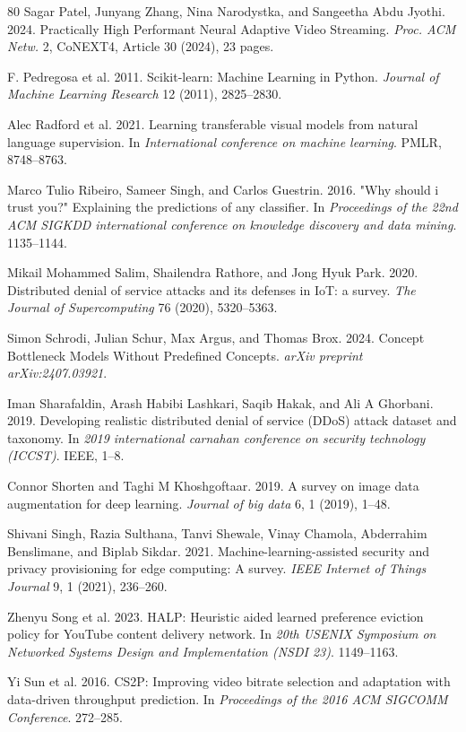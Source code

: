\documentclass[11pt,a4paper]{article}
\begin{document}
\begin{thebibliography}{80}
 Sagar Patel, Junyang Zhang, Nina Narodystka, and Sangeetha Abdu Jyothi. 2024. Practically High Performant Neural Adaptive Video Streaming. \emph{Proc. ACM Netw.} 2, CoNEXT4, Article 30 (2024), 23 pages.

 F. Pedregosa et al. 2011. Scikit-learn: Machine Learning in Python. \emph{Journal of Machine Learning Research} 12 (2011), 2825--2830.

 Alec Radford et al. 2021. Learning transferable visual models from natural language supervision. In \emph{International conference on machine learning}. PMLR, 8748--8763.

 Marco Tulio Ribeiro, Sameer Singh, and Carlos Guestrin. 2016. "Why should i trust you?" Explaining the predictions of any classifier. In \emph{Proceedings of the 22nd ACM SIGKDD international conference on knowledge discovery and data mining}. 1135--1144.

 Mikail Mohammed Salim, Shailendra Rathore, and Jong Hyuk Park. 2020. Distributed denial of service attacks and its defenses in IoT: a survey. \emph{The Journal of Supercomputing} 76 (2020), 5320--5363.

 Simon Schrodi, Julian Schur, Max Argus, and Thomas Brox. 2024. Concept Bottleneck Models Without Predefined Concepts. \emph{arXiv preprint arXiv:2407.03921}.

 Iman Sharafaldin, Arash Habibi Lashkari, Saqib Hakak, and Ali A Ghorbani. 2019. Developing realistic distributed denial of service (DDoS) attack dataset and taxonomy. In \emph{2019 international carnahan conference on security technology (ICCST)}. IEEE, 1--8.

 Connor Shorten and Taghi M Khoshgoftaar. 2019. A survey on image data augmentation for deep learning. \emph{Journal of big data} 6, 1 (2019), 1--48.

 Shivani Singh, Razia Sulthana, Tanvi Shewale, Vinay Chamola, Abderrahim Benslimane, and Biplab Sikdar. 2021. Machine-learning-assisted security and privacy provisioning for edge computing: A survey. \emph{IEEE Internet of Things Journal} 9, 1 (2021), 236--260.

 Zhenyu Song et al. 2023. HALP: Heuristic aided learned preference eviction policy for YouTube content delivery network. In \emph{20th USENIX Symposium on Networked Systems Design and Implementation (NSDI 23)}. 1149--1163.

 Yi Sun et al. 2016. CS2P: Improving video bitrate selection and adaptation with data-driven throughput prediction. In \emph{Proceedings of the 2016 ACM SIGCOMM Conference}. 272--285.


\end{thebibliography}
\end{document}
